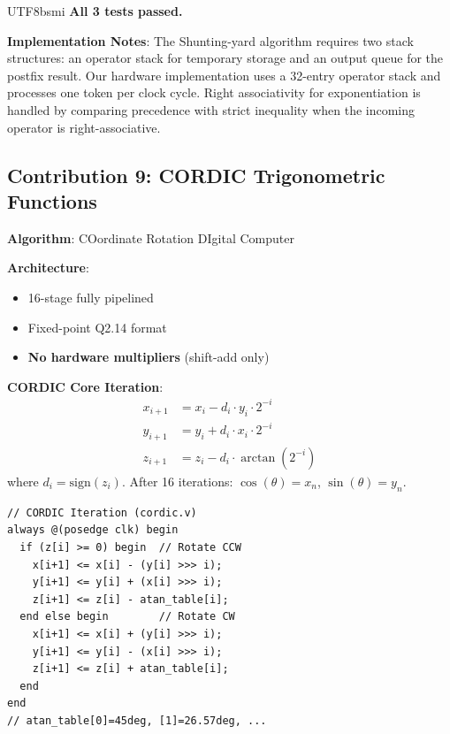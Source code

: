 \documentclass[journal,twoside]{IEEEtran}
\begin{document}
\begin{CJK}{UTF8}{bsmi}
\textbf{All 3 tests passed.}

\textbf{Implementation Notes}: The Shunting-yard algorithm requires two stack structures: an operator stack for temporary storage and an output queue for the postfix result. Our hardware implementation uses a 32-entry operator stack and processes one token per clock cycle. Right associativity for exponentiation is handled by comparing precedence with strict inequality when the incoming operator is right-associative.

\FloatBarrier  %
\subsection{Contribution 9: CORDIC Trigonometric Functions}

\textbf{Algorithm}: COordinate Rotation DIgital Computer~\cite{volder1959cordic}

\textbf{Architecture}:
\begin{itemize}
    \item 16-stage fully pipelined
    \item Fixed-point Q2.14 format
    \item \textbf{No hardware multipliers} (shift-add only)
\end{itemize}

\textbf{CORDIC Core Iteration}:
\begin{align}
x_{i+1} &= x_i - d_i \cdot y_i \cdot 2^{-i} \\
y_{i+1} &= y_i + d_i \cdot x_i \cdot 2^{-i} \\
z_{i+1} &= z_i - d_i \cdot \arctan(2^{-i})
\end{align}
where $d_i = \text{sign}(z_i)$. After 16 iterations: $\cos(\theta) = x_n$, $\sin(\theta) = y_n$.

\begin{lstlisting}
// CORDIC Iteration (cordic.v)
always @(posedge clk) begin
  if (z[i] >= 0) begin  // Rotate CCW
    x[i+1] <= x[i] - (y[i] >>> i);
    y[i+1] <= y[i] + (x[i] >>> i);
    z[i+1] <= z[i] - atan_table[i];
  end else begin        // Rotate CW
    x[i+1] <= x[i] + (y[i] >>> i);
    y[i+1] <= y[i] - (x[i] >>> i);
    z[i+1] <= z[i] + atan_table[i];
  end
end
// atan_table[0]=45deg, [1]=26.57deg, ...
\end{lstlisting}


\end{CJK}
\end{document}
